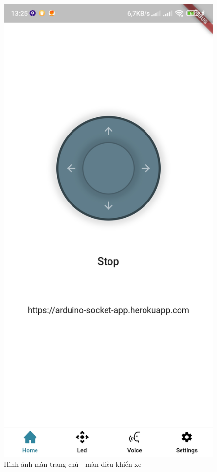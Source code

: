 \documentclass[../DoAn.tex]{subfiles}
\begin{document}
\begin{figure}[H]
    \centering
    \includegraphics[scale = 0.2]{Hinhve/app_1.jpg}
    \caption{Hình ảnh màn trang chủ - màn điều khiển xe}
    \label{fig:Fig9}
\end{figure}
\end{document}
